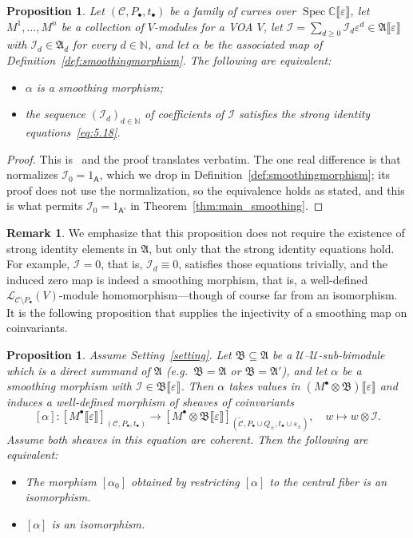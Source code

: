 \documentclass[12pt,a4paper,reqno]{amsart}
\numberwithin{equation}{section}
\newtheorem{proposition}[theorem]{Proposition}
\theoremstyle{definition}
\newtheorem{remark}[theorem]{Remark}
\newcommand{\C}{\mathbb{C}}
\newcommand{\N}{\mathbb{N}}
\newcommand{\I}{\mathscr{I}}
\newcommand{\CCC}{\mathscr{C}}
\newcommand{\LL}{\mathcal{L}}
\newcommand{\lb}{\llbracket}
\newcommand{\rb}{\rrbracket}
\def\o{\otimes}
\def\scrU{\mathscr{U}}
\def\fA{\mathfrak{A}}
\def\fB{\mathfrak{B}}
\def\A{\mathsf{A}}
\begin{document}
\begin{proposition}\label{prop:smoothing_well_defined}
    Let $(\CCC, P_\bullet, t_\bullet)$ be a family of curves over $\operatorname{Spec}\C\lb \varepsilon\rb$, let $M^1,\dots,M^n$ be a collection of $V$-modules for a VOA $V$, let $\I=\sum_{d\geq 0}\I_d\varepsilon^d\in\fA\lb\varepsilon\rb$ with $\I_d\in \fA_d$ for every $d\in\N$, and let $\alpha$ be the associated map of Definition~\ref{def:smoothingmorphism}. The following are equivalent:
    \begin{itemize}
        \item $\alpha$ is a smoothing morphism;
        \item the sequence $(\I_d)_{d \in \N}$ of coefficients of $\I$ satisfies the strong identity equations~\eqref{eq:5.18}.
    \end{itemize}
\end{proposition}
\begin{proof}
This is~\cite[Proposition 5.1.2]{DGK2} and the proof translates verbatim. The one real difference is that
\cite[Definition 5.1.1]{DGK2} normalizes $\I_0=1_\A$, which we drop in
Definition~\ref{def:smoothingmorphism}; its proof does not use the normalization,
so the equivalence holds as stated, and this is what permits $\I_0=1_{\A'}$ in
Theorem~\ref{thm:main_smoothing}.
\end{proof}
\begin{remark}
    We emphasize that this proposition does not require the existence of strong identity elements in $\fA$, but only that the strong identity equations hold. For example, $\I=0$, that is, $\I_d\equiv 0$, satisfies those equations trivially, and the induced zero map is indeed a smoothing morphism, that is, a well-defined $\LL_{\CCC \setminus P_\bullet}(V)$-module homomorphism---though of course far from an isomorphism. It is the following proposition that supplies the injectivity of a smoothing map on coinvariants.
\end{remark}
\begin{proposition}\label{prop:smoothing}
    Assume Setting~\ref{setting}. Let $\fB\subseteq\fA$ be a $\scrU$--$\scrU$-sub-bimodule which is a direct summand of $\fA$ (e.g.\ $\fB=\fA$ or $\fB=\fA'$), and let $\alpha$ be a smoothing morphism with $\I\in\fB\lb\varepsilon\rb$. Then $\alpha$ takes values in $(M^\bullet\o\fB)\lb\varepsilon\rb$ and induces a well-defined morphism of sheaves of coinvariants
    \begin{equation}\label{eq:alphaB}
         [\alpha]: [M^\bullet\lb \varepsilon\rb]_{(\CCC,P_\bullet, t_\bullet)}  \longrightarrow [M^\bullet \otimes \fB \lb \varepsilon\rb ]_{(\widetilde{\CCC},P_\bullet \cup Q_\pm, t_\bullet \cup s_\pm)}, \quad w \mapsto w \otimes \I.
    \end{equation}
    Assume both sheaves in this equation are coherent. Then the following are equivalent:
    \begin{itemize}
        \item The morphism $[\alpha_0]$ obtained by restricting $[\alpha]$ to the central fiber is an isomorphism.
        \item $[\alpha]$ is an isomorphism.
    \end{itemize}
\end{proposition}
\end{document}
